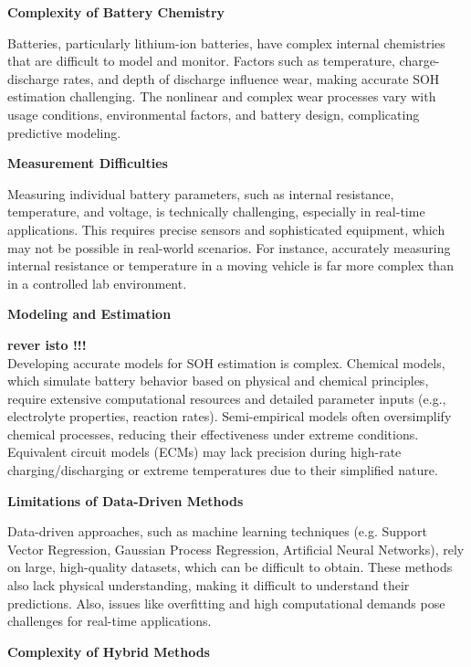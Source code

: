 \vspace{1cm}
\textbf{Complexity of Battery Chemistry}

Batteries, particularly lithium-ion batteries, have complex internal chemistries that are difficult to model and monitor.
Factors such as temperature, charge-discharge rates, and depth of discharge influence wear, making accurate SOH estimation challenging. 
The nonlinear and complex wear processes vary with usage conditions, environmental factors, and battery design, complicating predictive modeling.

\vspace{1cm}
\textbf{Measurement Difficulties}

Measuring individual battery parameters, such as internal resistance, temperature, and voltage, is technically challenging, especially in real-time applications. 
This requires precise sensors and sophisticated equipment, which may not be possible in real-world scenarios. 
For instance, accurately measuring internal resistance or temperature in a moving vehicle is far more complex than in a controlled lab environment.

\vspace{1cm}
\textbf{Modeling and Estimation}

\textbf{rever isto !!!} \\
Developing accurate models for SOH estimation is complex. 
Chemical models, which simulate battery behavior based on physical and chemical principles, require extensive computational resources and detailed parameter inputs (e.g., electrolyte properties, reaction rates). 
Semi-empirical models often oversimplify chemical processes, reducing their effectiveness under extreme conditions. Equivalent circuit models (ECMs) may lack precision during high-rate charging/discharging or extreme temperatures due to their simplified nature.

\vspace{1cm}
\textbf{Limitations of Data-Driven Methods}

Data-driven approaches, such as machine learning techniques (e.g. Support Vector Regression, Gaussian Process Regression, Artificial Neural Networks), rely on large, high-quality datasets, which can be difficult to obtain. 
These methods also lack physical understanding, making it difficult to understand their predictions. 
Also, issues like overfitting and high computational demands pose challenges for real-time applications.

\vspace{1cm}
\textbf{Complexity of Hybrid Methods}

